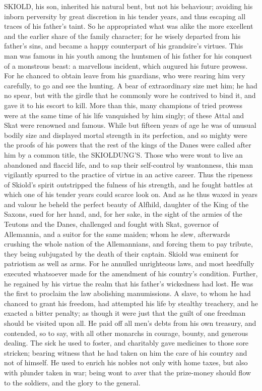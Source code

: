 \documentclass[10pt,a4paper]{report}
\begin{document}
SKIOLD, his son, inherited his natural bent, but not his behaviour; avoiding his inborn perversity by great discretion in his tender years, and thus escaping all traces of his father's taint. So he appropriated what was alike the more excellent and the earlier share of the family character; for he wisely departed from his father's sins, and became a happy counterpart of his grandsire's virtues. This man was famous in his youth among the huntsmen of his father for his conquest of a monstrous beast: a marvellous incident, which augured his future prowess. For he chanced to obtain leave from his guardians, who were rearing him very carefully, to go and see the hunting. A bear of extraordinary size met him; he had no spear, but with the girdle that he commonly wore he contrived to bind it, and gave it to his escort to kill. More than this, many champions of tried prowess were at the same time of his life vanquished by him singly; of these Attal and Skat were renowned and famous. While but fifteen years of age he was of unusual bodily size and displayed mortal strength in its perfection, and so mighty were the proofs of his powers that the rest of the kings of the Danes were called after him by a common title, the SKIOLDUNG'S. Those who were wont to live an abandoned and flaccid life, and to sap their self-control by wantonness, this man vigilantly spurred to the practice of virtue in an active career. Thus the ripeness of Skiold's spirit outstripped the fulness of his strength, and he fought battles at which one of his tender years could scarce look on. And as he thus waxed in years and valour he beheld the perfect beauty of Alfhild, daughter of the King of the Saxons, sued for her hand, and, for her sake, in the sight of the armies of the Teutons and the Danes, challenged and fought with Skat, governor of Allemannia, and a suitor for the same maiden; whom he slew, afterwards crushing the whole nation of the Allemannians, and forcing them to pay tribute, they being subjugated by the death of their captain. Skiold was eminent for patriotism as well as arms. For he annulled unrighteous laws, and most heedfully executed whatsoever made for the amendment of his country's condition. Further, he regained by his virtue the realm that his father's wickedness had lost. He was the first to proclaim the law abolishing manumissions. A slave, to whom he had chanced to grant his freedom, had attempted his life by stealthy treachery, and he exacted a bitter penalty; as though it were just that the guilt of one freedman should be visited upon all. He paid off all men's debts from his own treasury, and contended, so to say, with all other monarchs in courage, bounty, and generous dealing. The sick he used to foster, and charitably gave medicines to those sore stricken; bearing witness that he had taken on him the care of his country and not of himself. He used to enrich his nobles not only with home taxes, but also with plunder taken in war; being wont to aver that the prize-money should flow to the soldiers, and the glory to the general.\\
\end{document}
